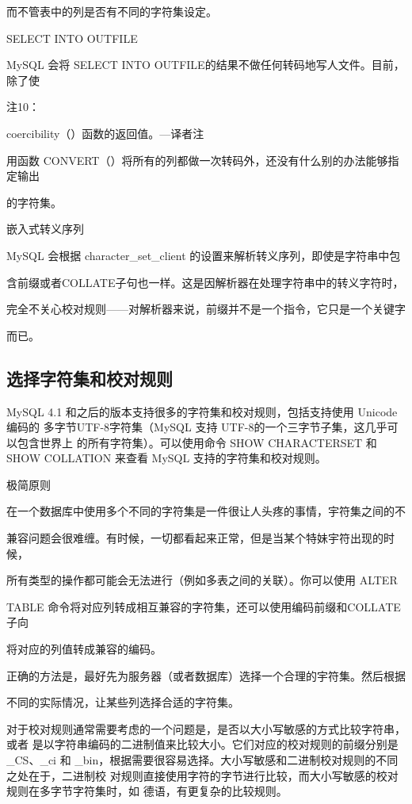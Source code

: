 而不管表中的列是否有不同的字符集设定。

SELECT INTO OUTFILE

MySQL 会将 SELECT INTO OUTFILE的结果不做任何转码地写人文件。目前，除了使

注10：

coercibility（）函数的返回值。—译者注

用函数 CONVERT（）将所有的列都做一次转码外，还没有什么别的办法能够指定输出

的字符集。

嵌入式转义序列

MySQL 会根据 character\_set\_client 的设置来解析转义序列，即使是字符串中包

含前缀或者COLLATE子句也一样。这是因解析器在处理字符串中的转义字符时，

完全不关心校对规则——对解析器来说，前缀并不是一个指令，它只是一个关键字

而已。

\subsection{选择字符集和校对规则}
MySQL 4.1 和之后的版本支持很多的字符集和校对规则，包括支持使用 Unicode 编码的
多字节UTF-8字符集（MySQL 支持 UTF-8的一个三字节子集，这几乎可以包含世界上
的所有字符集）。可以使用命令 SHOW CHARACTERSET 和 SHOW COLLATION 来查看 MySQL
支持的字符集和校对规则。

极简原则

在一个数据库中使用多个不同的字符集是一件很让人头疼的事情，宇符集之间的不

兼容问题会很难缠。有时候，一切都看起来正常，但是当某个特妹宇符出现的时候，

所有类型的操作都可能会无法进行（例如多表之间的关联）。你可以使用 ALTER

TABLE 命令将对应列转成相互兼容的字符集，还可以使用编码前缀和COLLATE 子向

将对应的列值转成兼容的编码。

正确的方法是，最好先为服务器（或者数据库）选择一个合理的宇符集。然后根据

不同的实际情况，让某些列选择合适的字符集。

对于校对规则通常需要考虑的一个问题是，是否以大小写敏感的方式比较字符串，或者
是以字符串编码的二进制值来比较大小。它们对应的校对规则的前缀分别是\_CS、\_ci 和
\_bin，根据需要很容易选择。大小写敏感和二进制校对规则的不同之处在于，二进制校
对规则直接使用字符的字节进行比较，而大小写敏感的校对规则在多字节字符集时，如
德语，有更复杂的比较规则。

